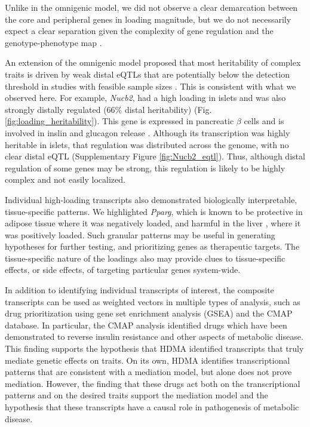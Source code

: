 \documentclass[
]{article}
\begin{document}
Unlike in the omnigenic model, we did not observe a clear demarcation
between the core and peripheral genes in loading magnitude, but we do
not necessarily expect a clear separation given the complexity of gene
regulation and the genotype-phenotype map \cite{pmid29906445}.

An extension of the omnigenic model proposed that most heritability of
complex traits is driven by weak distal eQTLs that are potentially below
the detection threshold in studies with feasible sample sizes
\cite{pmid31051098}. This is consistent with what we observed here. For
example, \textit{Nucb2}, had a high loading in islets and was also
strongly distally regulated (66\% distal heritability) (Fig.
\ref{fig:loading_heritability}). This gene is expressed in pancreatic
\(\beta\) cells and is involved in inslin and glucagon release
\cite{pmid24993278, pmid23537085, pmid22108805}. Although its
transcription was highly heritable in islets, that regulation was
distributed across the genome, with no clear distal eQTL (Supplementary
Figure \ref{fig:Nucb2_eqtl}). Thus, although distal regulation of some
genes may be strong, this regulation is likely to be highly complex and
not easily localized.

Individual high-loading transcripts also demonstrated biologically
interpretable, tissue-specific patterns. We highlighted \textit{Pparg},
which is known to be protective in adipose tissue \cite{pmid17389767}
where it was negatively loaded, and harmful in the liver
\cite{pmid12805374, pmid12618528, 
pmid16357043, pmid15644454, pmid16403437}, where it was positively
loaded. Such granular patterns may be useful in generating hypotheses
for further testing, and prioritizing genes as therapeutic targets. The
tissue-specific nature of the loadings also may provide clues to
tissue-specific effects, or side effects, of targeting particular genes
system-wide.

In addition to identifying individual transcripts of interest, the
composite transcripts can be used as weighted vectors in multiple types
of analysis, such as drug prioritization using gene set enrichment
analysis (GSEA) and the CMAP database. In particular, the CMAP analysis
identified drugs which have been demonstrated to reverse insulin
resistance and other aspects of metabolic disease. This finding supports
the hypothesis that HDMA identified transcripts that truly mediate
genetic effects on traits. On its own, HDMA identifies transcriptional
patterns that are consistent with a mediation model, but alone does not
prove mediation. However, the finding that these drugs act both on the
transcriptional patterns and on the desired traits support the mediation
model and the hypothesis that these transcripts have a causal role in
pathogenesis of metabolic disease.
\end{document}
